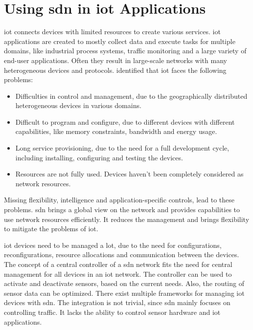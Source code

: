 \documentclass[conference]{IEEEtran}
\begin{document}
	\section{Using \ac{sdn} in \ac{iot} Applications}
	\label{sec:sdn-iot}

	\acf{iot} connects devices with limited resources to create various services. \ac{iot} applications are created to mostly collect data and execute tasks for multiple domains, like industrial process systems, traffic monitoring and a large variety  of end-user applications. Often they result in large-scale networks with many heterogeneous devices and protocols. \cite{Li2020-lx} \citeauthor{Li2020-lx} identified that \ac{iot} faces the following problems: 

	\begin{itemize}
		\item Difficulties in control and management, due to the geographically distributed heterogeneous devices in various domains.
		\item Difficult to program and configure, due to different devices with different capabilities, like memory constraints, bandwidth and energy usage.
		\item Long service provisioning, due to the need for a full development cycle, including installing, configuring and testing the devices. 
		\item Resources are not fully used. Devices haven't been completely considered as network resources. \cite{Sahrish2017}
	\end{itemize}

	Missing flexibility, intelligence and application-specific controls, lead to these problems. \ac{sdn} brings a global view on the network and provides capabilities to use network resources efficiently. It reduces the management and brings flexibility to mitigate the problems of \ac{iot}.

	\ac{iot} devices need to be managed a lot, due to the need for configurations, reconfigurations, resource allocations and communication between the devices. \cite{Sahrish2017} The concept of a central controller of a \ac{sdn} network fits the need for central management for all devices in an \ac{iot} network. The controller can be used to activate and deactivate sensors, based on the current needs. Also, the routing of sensor data can be optimized. \cite{Li2020-lx} There exist multiple frameworks for managing \ac{iot} devices with \ac{sdn}. \cite{Sahrish2017} The integration is not trivial, since \ac{sdn} mainly focuses on controlling traffic. It lacks the ability to control sensor hardware and \ac{iot} applications. \cite{Li2020-lx}
\end{document}
